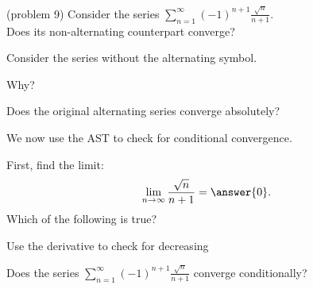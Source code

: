 \documentclass[handout]{ximera}
\begin{document}
\begin{problem}(problem 9)
Consider the series $\displaystyle{\sum_{n=1}^\infty (-1)^{n+1} \frac{\sqrt n}{n + 1}}$.\\
Does its non-alternating counterpart converge?
\begin{hint} 
Consider the series without the alternating symbol.
\end{hint}
\begin{multipleChoice}
\end{multipleChoice}

Why?
\begin{multipleChoice}
\end{multipleChoice}




Does the original alternating series converge absolutely?
\begin{multipleChoice}
\end{multipleChoice}

We now use the AST to check for conditional convergence.

First, find the limit:
\[
\lim_{n\to\infty} \frac{\sqrt n}{n + 1} = \answer{0}.
\]
Which of the following is true? 
\begin{hint}
Use the derivative to check for decreasing
\end{hint}
\begin{multipleChoice}
\end{multipleChoice}


Does the series $\displaystyle{\sum_{n=1}^\infty (-1)^{n+1} \frac{\sqrt n}{n + 1}}$ converge conditionally?
\begin{multipleChoice}
\end{multipleChoice}

\end{problem}
\end{document}
